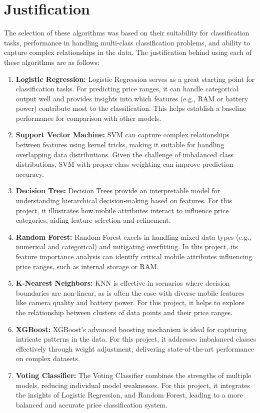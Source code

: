 \documentclass[12pt]{report}
\begin{document}
\section{Justification}
The selection of these algorithms was based on their suitability for classification tasks, performance in handling multi-class classification problems, and ability to capture complex relationships in the data. The justification behind using each of these algorithms are as follows:
\vspace{-1.25em}
\begin{enumerate}
	\setlength\itemsep{-1.05em}
\item{\textbf{Logistic Regression: }}Logistic Regression serves as a great starting point for classification tasks. For predicting price ranges, it can handle categorical output well and provides insights into which features (e.g., RAM or battery power) contribute most to the classification. This helps establish a baseline performance for comparison with other models.
\item{\textbf{Support Vector Machine: }}SVM can capture complex relationships between features using kernel tricks, making it suitable for handling overlapping data distributions. Given the challenge of imbalanced class distributions, SVM with proper class weighting can improve prediction accuracy.
\item{\textbf{Decision Tree: }}Decision Trees provide an interpretable model for understanding hierarchical decision-making based on features. For this project, it illustrates how mobile attributes interact to influence price categories, aiding feature selection and refinement.
\item{\textbf{Random Forest: }}Random Forest excels in handling mixed data types (e.g., numerical and categorical) and mitigating overfitting. In this project, its feature importance analysis can identify critical mobile attributes influencing price ranges, such as internal storage or RAM.

\item{\textbf{K-Nearest Neighbors: }}KNN is effective in scenarios where decision boundaries are non-linear, as is often the case with diverse mobile features like camera quality and battery power. For this project, it helps to explore the relationship between clusters of data points and their price ranges.

\item{\textbf{XGBoost: }}XGBoost’s advanced boosting mechanism is ideal for capturing intricate patterns in the data. For this project, it addresses imbalanced classes effectively through weight adjustment, delivering state-of-the-art performance on complex datasets.
\item{\textbf{Voting Classifier: }}The Voting Classifier combines the strengths of multiple models, reducing individual model weaknesses. For this project, it integrates the insights of Logistic Regression, and Random Forest, leading to a more balanced and accurate price classification system.
\end{enumerate}
\end{document}
